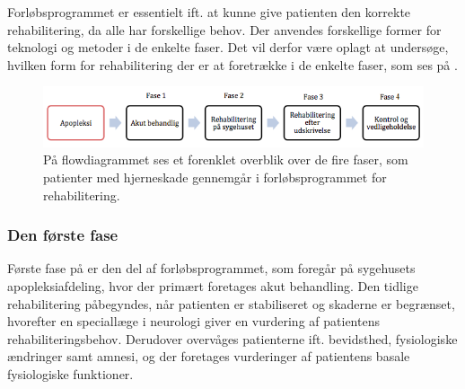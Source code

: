 Forløbsprogrammet er essentielt ift. at kunne give patienten den korrekte rehabilitering, da alle har forskellige behov. Der anvendes forskellige former for teknologi og metoder i de enkelte faser. Det vil derfor være oplagt at undersøge, hvilken form for rehabilitering der er at foretrække i de enkelte faser, som ses på .

\begin{figure}[H]
	\centering
	\includegraphics[scale=1.2]{figures/bProblemanalyse/flowdiagram_faser1.png}
	\caption{På flowdiagrammet ses et forenklet overblik over de fire faser, som patienter med hjerneskade gennemgår i forløbsprogrammet for rehabilitering. \cite{Sundhedsstyrelsen2011a}} 
	\label{firefaser}
\end{figure}

\subsubsection{Den første fase}
Første fase på  er den del af forløbsprogrammet, som foregår på sygehusets apopleksiafdeling, hvor der primært foretages akut behandling. Den tidlige rehabilitering påbegyndes, når patienten er stabiliseret og skaderne er begrænset, hvorefter en speciallæge i neurologi giver en vurdering af patientens rehabiliteringsbehov. Derudover overvåges patienterne ift. bevidsthed, fysiologiske ændringer samt amnesi, og der foretages vurderinger af patientens basale fysiologiske funktioner. \cite{Sundhedsstyrelsen2011a} %

